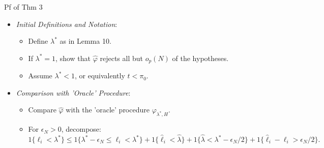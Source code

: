 \documentclass[10pt, aspectratio=169]{beamer}
\begin{document}
\begin{frame}{Pf of Thm 3}
    \begin{itemize}[label=\scalebox{0.5}{$\bullet$}]
        \setlength{\itemsep}{\baselineskip}
        \item \textit{Initial Definitions and Notation}:
            \begin{itemize}[label=\scalebox{0.5}{$\bullet$}]
                \setlength{\itemsep}{\baselineskip}
                \item Define \(\lambda^*\) as in Lemma 10.
                \item If \(\lambda^* = 1\), show that \(\hat{\varphi}\) rejects all but \(o_p(N)\) of the hypotheses.
                \item Assume \(\lambda^* < 1\), or equivalently \(t < \pi_0\).
            \end{itemize}

        \item \textit{Comparison with 'Oracle' Procedure}:
            \begin{itemize}[label=\scalebox{0.5}{$\bullet$}]
                \setlength{\itemsep}{\baselineskip}
                \item Compare \(\hat{\varphi}\) with the 'oracle' procedure \(\varphi_{\lambda^*, H}\).
                \item For \(\epsilon_N > 0\), decompose:
                \[
                1\{\ell_i < \lambda^*\} \leq 1\{\lambda^* - \epsilon_N \leq \ell_i < \lambda^*\} + 1\{\hat{\ell}_i < \hat{\lambda}\} + 1\{\hat{\lambda} < \lambda^* - \epsilon_N/2\} + 1\{\hat{\ell}_i - \ell_i > \epsilon_N/2\}.
                \]
            \end{itemize}

        
    \end{itemize}
\end{frame}
\end{document}
